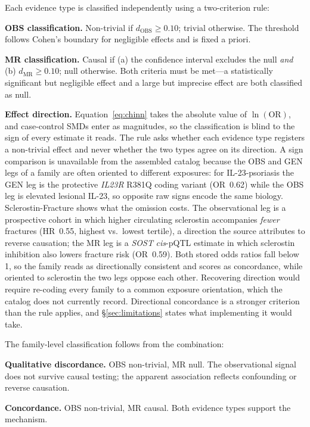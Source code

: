 \documentclass[11pt]{article}
\begin{document}
Each evidence type is classified independently using a two-criterion rule:

\textbf{OBS classification.} Non-trivial if $d_{\text{OBS}} \geq 0.10$; trivial otherwise. The threshold follows Cohen's boundary for negligible effects and is fixed a priori.

\textbf{MR classification.} Causal if (a) the confidence interval excludes the null \emph{and} (b) $d_{\text{MR}} \geq 0.10$; null otherwise. Both criteria must be met---a statistically significant but negligible effect and a large but imprecise effect are both classified as null.

\textbf{Effect direction.} Equation~\ref{eq:chinn} takes the absolute value of $\ln(\text{OR})$, and case-control SMDs enter as magnitudes, so the classification is blind to the sign of every estimate it reads. The rule asks whether each evidence type registers a non-trivial effect and never whether the two types agree on its direction. A sign comparison is unavailable from the assembled catalog because the OBS and GEN legs of a family are often oriented to different exposures: for IL-23-psoriasis the GEN leg is the protective \emph{IL23R} R381Q coding variant (OR~0.62) while the OBS leg is elevated lesional IL-23, so opposite raw signs encode the same biology. Sclerostin-Fracture shows what the omission costs. The observational leg is a prospective cohort in which higher circulating sclerostin accompanies \emph{fewer} fractures (HR~0.55, highest vs.\ lowest tertile), a direction the source attributes to reverse causation; the MR leg is a \emph{SOST} \emph{cis}-pQTL estimate in which sclerostin inhibition also lowers fracture risk (OR~0.59). Both stored odds ratios fall below 1, so the family reads as directionally consistent and scores as concordance, while oriented to sclerostin the two legs oppose each other. Recovering direction would require re-coding every family to a common exposure orientation, which the catalog does not currently record. Directional concordance is a stronger criterion than the rule applies, and \S\ref{sec:limitations} states what implementing it would take.

The family-level classification follows from the combination:

\textbf{Qualitative discordance.} OBS non-trivial, MR null. The observational signal does not survive causal testing; the apparent association reflects confounding or reverse causation.

\textbf{Concordance.} OBS non-trivial, MR causal. Both evidence types support the mechanism.
\end{document}

